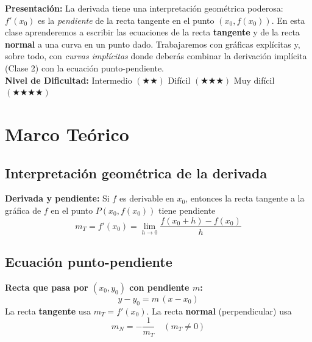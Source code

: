 \documentclass[12pt, letterpaper]{article}
\begin{document}


\vspace{4pt}
\begin{cuadroinfo}
  \small
  \textbf{Presentación:} La derivada tiene una interpretación geométrica poderosa: $f'(x_0)$ es la \emph{pendiente} de la recta tangente en el punto $(x_0, f(x_0))$. En esta clase aprenderemos a escribir las ecuaciones de la recta \textbf{tangente} y de la recta \textbf{normal} a una curva en un punto dado. Trabajaremos con gráficas explícitas y, sobre todo, con \emph{curvas implícitas} donde deberás combinar la derivación implícita (Clase 2) con la ecuación punto-pendiente.
  \\[6pt]
  \textbf{Nivel de Dificultad:}\quad
  \medio{} Intermedio $(\bigstar\bigstar)$ \quad
  \dificil{} Difícil $(\bigstar\bigstar\bigstar)$ \quad
  \muyDificil{} Muy difícil $(\bigstar\bigstar\bigstar\bigstar)$
\end{cuadroinfo}

\vspace{8pt}

\section{Marco Teórico}

\subsection{Interpretación geométrica de la derivada}

\begin{cuadroteoria}
  \textbf{Derivada y pendiente:} Si $f$ es derivable en $x_0$, entonces la recta tangente a la gráfica de $f$ en el punto $P(x_0, f(x_0))$ tiene pendiente
  \[
    m_T = f'(x_0) = \lim_{h\to0}\frac{f(x_0+h) - f(x_0)}{h}
  \]
\end{cuadroteoria}

\subsection{Ecuación punto-pendiente}

\begin{cuadroteoria}
  \textbf{Recta que pasa por $(x_0, y_0)$ con pendiente $m$:}
  \[
    y - y_0 = m\,(x - x_0)
  \]
  La recta \textbf{tangente} usa $m_T = f'(x_0)$. La recta \textbf{normal} (perpendicular) usa
  \[
    m_N = -\frac{1}{m_T} \quad (m_T \neq 0)
  \]
\end{cuadroteoria}
\end{document}
